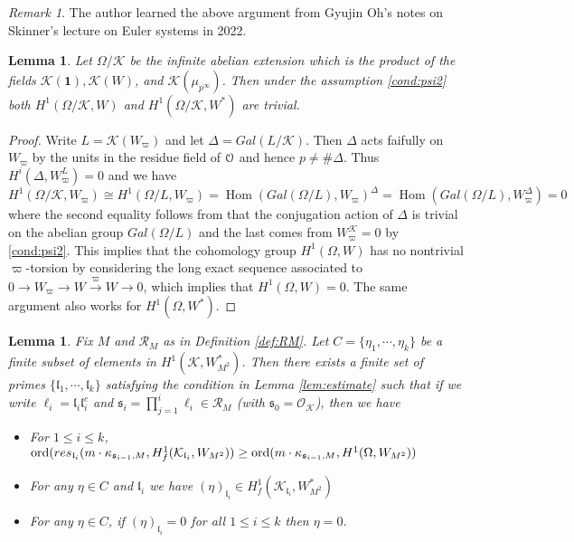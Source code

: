 \documentclass[leqno]{amsart}
\newtheorem{lem}[thm]{Lemma}
\theoremstyle{definition}
\theoremstyle{remark}
\newtheorem{rem}[thm]{Remark}
\newcommand{\id}{\mathbf{1}}
\newcommand{\oo}{\mathcal{O}}
\newcommand{\eo}{\EuScript{O}}
\DeclareMathOperator{\Hom}{Hom}
\newcommand{\fl}{\mathfrak{l}}
\newcommand{\fs}{\mathfrak{s}}
\newcommand{\K}{{\mathcal{K}}} %
\begin{document}
\begin{rem}
The author learned the above argument 
from Gyujin Oh's notes on 
Skinner's lecture on Euler systems in 2022.
\end{rem}

\begin{lem}\label{lem:vanish}
    Let $\Omega/\K$ be the infinite abelian extension
    which is the product of the fields
    $\K(\id), \K(W)$, and $\K(\mu_{p^\infty})$.
    Then under the assumption \ref{cond:psi2} both 
    $H^1(\Omega/\K, W)$ and $H^1(\Omega/\K, W^*)$ 
	are trivial.
\end{lem}
\begin{proof}
    Write $L=\K(W_{\varpi})$ and let $\Delta=Gal(L/\K)$.
    Then $\Delta$ acts faifully on $W_{\varpi}$
    by the units in the residue field of $\eo$
    and hence $p\neq \#\Delta$.
    Thus $H^i(\Delta, W_\varpi^L)=0$ and we have
	\[
		H^1(\Omega/\K,W_{\varpi})\cong
		H^1(\Omega/L,W_{\varpi})=
		\Hom(Gal(\Omega/L),W_{\varpi})^\Delta=
		\Hom(Gal(\Omega/L),W_{\varpi}^\Delta)=0
	\]
    where the second equality follows from that
    the conjugation action of $\Delta$ 
    is trivial on the abelian group $Gal(\Omega/L)$
    and the last comes from 
    $W_{\varpi}^\K=0$ by \ref{cond:psi2}.
    This implies that the cohomology group 
    $H^1(\Omega,W)$
	has no nontrivial $\varpi$-torsion
    by considering the long exact sequence associated to
	$0\to W_\varpi\to W\xrightarrow{\varpi}W\to 0$,
    which implies that $H^1(\Omega,W)=0$.
	The same argument also works for $H^1(\Omega,W^*)$.
\end{proof}


\begin{lem}
Fix $M$ and $\mathcal{R}_M$ as in Definition \ref{def:RM}.
Let  $C=\{\eta_1,\cdots,\eta_k\}$
be a finite subset of elements in $H^1(\K,W_{M^2}^*)$.
Then there exists a finite set of primes
$\{\fl_1,\cdots,\fl_k\}$ satisfying the condition in 
Lemma \ref{lem:estimate}
such that if we write $\ell_i=\fl_i\fl_i^c$
and $\fs_i=\prod_{j=1}^i\ell_i\in \mathcal{R}_M$
(with $\fs_0=\oo_\K$), then we have
\begin{itemize}
\item For $1\leq i\leq k$,
$\textnormal{ord}( res_{\fl_i}(m\cdot \kappa_{\fs_{i-1},M},
H^1_f(\K_{\fl_i}, W_{M^2}))\geq
\textnormal{ord}( m\cdot \kappa_{\fs_{i-1},M}, H^1(\Omega,W_{M^2}))$
\item For any $\eta\in C$ and $\fl_i$
we have $(\eta)_{\fl_i}\in H^1_f(\K_{\fl_i},W_{M^2}^*)$
\item For any $\eta\in C$,
if $(\eta)_{\fl_i}=0$ for all $1\leq i\leq k$ then $\eta=0$.
\end{itemize}

\end{lem}
\end{document}
